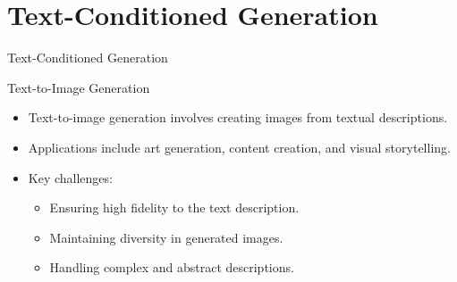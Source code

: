 \section{Text-Conditioned Generation}
\begin{frame}{}
    \LARGE Text-Conditioned Generation
\end{frame}

\begin{frame}{Text-to-Image Generation}
    \begin{itemize}
        \item Text-to-image generation involves creating images from textual descriptions.
        \item Applications include art generation, content creation, and visual storytelling.
        \item Key challenges:
        \begin{itemize}
            \item Ensuring high fidelity to the text description.
            \item Maintaining diversity in generated images.
            \item Handling complex and abstract descriptions.
        \end{itemize}
    \end{itemize}
\end{frame}


